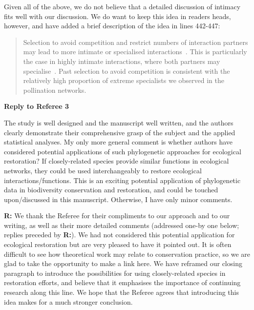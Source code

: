 \documentclass[12pt]{letter}
\newenvironment{refquote}{\bigskip \begin{it}}{\end{it}\smallskip}
\begin{document}
		Given all of the above, we do not believe that a detailed discussion of intimacy fits well with our discussion. We do want to keep this idea in readers heads, however, and have added a brief description of the idea in lines 442-447:


		\begin{quotation}

			Selection to avoid 
			competition and restrict numbers of interaction partners may lead to
			more intimate or specialised interactions~\citep{Ponisio2017}. 
			This is particularly the case in highly intimate interactions, where both partners may specialise~\citep{Hembry2018}.
			Past selection to avoid competition is 
			consistent with the relatively high proportion of extreme specialists we
			observed in the pollination networks.

		\end{quotation}



\clearpage

{\Large \bf Reply to Referee 3} 

	\begin{refquote}
		The study is well designed and the manuscript well written, and the authors clearly demonstrate their comprehensive grasp of the subject and the applied statistical analyses.
		My only more general comment is whether authors have considered potential applications of such phylogenetic approaches for ecological restoration? If closely-related species provide similar functions in ecological networks, they could be used interchangeably to restore ecological interactions/functions. This is an exciting potential application of phylogenetic data in biodiversity conservation and restoration, and could be touched upon/discussed in this manuscript.
		Otherwise, I have only minor comments.
	\end{refquote}

	\textbf{R:} We thank the Referee for their compliments to our approach and to our writing, as well as their more detailed comments (addressed one-by one below; replies preceded by \textbf{R:}). We had not considered this potential application for ecological restoration but are very pleased to have it pointed out. It is often difficult to see how theoretical work may relate to conservation practice, so we are glad to take the opportunity to make a link here. We have reframed our closing paragraph to introduce the possibilities for using closely-related species in restoration efforts, and believe that it emphasises the importance of continuing research along this line. We hope that the Referee agrees that introducing this idea makes for a much stronger conclusion.
\end{document}
